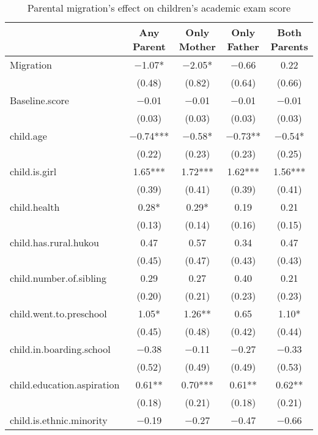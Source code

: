 \documentclass[
  man]{apa7}
\begin{document}
\begin{table}

\caption{Parental migration’s effect on children’s academic exam score}
\centering
\begin{tabular}[t]{lcccc}
\toprule
  & Any Parent & Only Mother & Only Father & Both Parents\\
\midrule
Migration & \num{-1.07}* & \num{-2.05}* & \num{-0.66} & \num{0.22}\\
 & (\num{0.48}) & (\num{0.82}) & (\num{0.64}) & (\num{0.66})\\
Baseline.score & \num{-0.01} & \num{-0.01} & \num{-0.01} & \num{-0.01}\\
 & (\num{0.03}) & (\num{0.03}) & (\num{0.03}) & (\num{0.03})\\
child.age & \num{-0.74}*** & \num{-0.58}* & \num{-0.73}** & \num{-0.54}*\\
 & (\num{0.22}) & (\num{0.23}) & (\num{0.23}) & (\num{0.25})\\
child.is.girl & \num{1.65}*** & \num{1.72}*** & \num{1.62}*** & \num{1.56}***\\
 & (\num{0.39}) & (\num{0.41}) & (\num{0.39}) & (\num{0.41})\\
child.health & \num{0.28}* & \num{0.29}* & \num{0.19} & \num{0.21}\\
 & (\num{0.13}) & (\num{0.14}) & (\num{0.16}) & (\num{0.15})\\
child.has.rural.hukou & \num{0.47} & \num{0.57} & \num{0.34} & \num{0.47}\\
 & (\num{0.45}) & (\num{0.47}) & (\num{0.43}) & (\num{0.43})\\
child.number.of.sibling & \num{0.29} & \num{0.27} & \num{0.40} & \num{0.21}\\
 & (\num{0.20}) & (\num{0.21}) & (\num{0.23}) & (\num{0.23})\\
child.went.to.preschool & \num{1.05}* & \num{1.26}** & \num{0.65} & \num{1.10}*\\
 & (\num{0.45}) & (\num{0.48}) & (\num{0.42}) & (\num{0.44})\\
child.in.boarding.school & \num{-0.38} & \num{-0.11} & \num{-0.27} & \num{-0.33}\\
 & (\num{0.52}) & (\num{0.49}) & (\num{0.49}) & (\num{0.53})\\
child.education.aspiration & \num{0.61}** & \num{0.70}*** & \num{0.61}** & \num{0.62}**\\
 & (\num{0.18}) & (\num{0.21}) & (\num{0.18}) & (\num{0.21})\\
child.is.ethnic.minority & \num{-0.19} & \num{-0.27} & \num{-0.47} & \num{-0.66}\\

\end{tabular}
\end{table}
\end{document}
